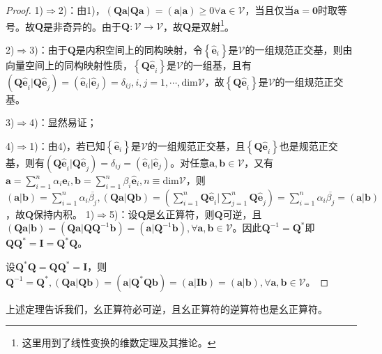 \documentclass[main.tex]{subfiles}
\begin{document}
\begin{proof}
    1)$\Rightarrow$2)：由1)，$\left(\mathbf{Qa}|\mathbf{Qa}\right)=\left(\mathbf{a}|\mathbf{a}\right)\geq0\forall\mathbf{a}\in\mathcal{V}$，当且仅当$\mathbf{a}=\mathbf{0}$时取等号。故$\mathbf{Q}$是非奇异的。由于$\mathbf{Q}:\mathcal{V}\rightarrow\mathcal{V}$，故$\mathbf{Q}$是双射\footnote{这里用到了线性变换的维数定理及其推论。}。

    2)$\Rightarrow$3)：由于$\mathbf{Q}$是内积空间上的同构映射，令$\left\{\mathbf{\hat{e}}_i\right\}$是$\mathcal{V}$的一组规范正交基，则由向量空间上的同构映射性质，$\left\{\mathbf{Q\hat{e}}_i\right\}$是$\mathcal{V}$的一组基，且有$\left(\mathbf{Q\hat{e}}_i|\mathbf{Q\hat{e}}_j\right)=\left(\mathbf{\hat{e}}_i|\mathbf{\hat{e}}_j\right)=\delta_{ij},i,j=1,\cdots,\mathrm{dim}\mathcal{V}$，故$\left\{\mathbf{Q\hat{e}}_i\right\}$是$\mathcal{V}$的一组规范正交基。

    3)$\Rightarrow$4)：显然易证；

    4)$\Rightarrow$1)：由4)，若已知$\left\{\mathbf{\hat{e}}_i\right\}$是$\mathcal{V}$的一组规范正交基，且$\left\{\mathbf{Q\hat{e}}_i\right\}$也是规范正交基，则有$\left(\mathbf{Q\hat{e}}_i|\mathbf{Q\hat{e}}_j\right)=\delta_{ij}=\left(\mathbf{\hat{e}}_i|\mathbf{\hat{e}}_j\right)$。对任意$\mathbf{a},\mathbf{b}\in\mathcal{V}$，又有$\mathbf{a}=\sum_{i=1}^{n}\alpha_i\mathbf{\hat{e}}_i,\mathbf{b}=\sum_{i=1}^{n}\beta_i\mathbf{\hat{e}}_i,n\equiv\mathrm{dim}\mathcal{V}$，则$\left(\mathbf{a}|\mathbf{b}\right)=\sum_{i=1}^n\alpha_i\overline{\beta_j},\left(\mathbf{Qa}|\mathbf{Qb}\right)=\left(\sum_{i=1}^n\mathbf{Q\hat{e}}_i|\sum_{j=1}^n\mathbf{Q\hat{e}}_j\right)=\sum_{i=1}^n\alpha_i\overline{\beta_j}=\left(\mathbf{a}|\mathbf{b}\right)$，故$\mathbf{Q}$保持内积。
    1)$\Rightarrow$5)：设$\mathbf{Q}$是幺正算符，则$\mathbf{Q}$可逆，且$\left(\mathbf{Qa}|\mathbf{b}\right)=\left(\mathbf{Qa}|\mathbf{QQ}^{-1}\mathbf{b}\right)=\left(\mathbf{a}|\mathbf{Q}^{-1}\mathbf{b}\right),\forall\mathbf{a},\mathbf{b}\in\mathcal{V}$。因此$\mathbf{Q}^{-1}=\mathbf{Q}^*$即$\mathbf{QQ}^*=\mathbf{I}=\mathbf{Q}^*\mathbf{Q}$。

    设$\mathbf{Q}^*\mathbf{Q}=\mathbf{QQ}^*=\mathbf{I}$，则$\mathbf{Q}^{-1}=\mathbf{Q}^*,\left(\mathbf{Qa}|\mathbf{Qb}\right)=\left(\mathbf{a}|\mathbf{Q}^*\mathbf{Qb}\right)=\left(\mathbf{a}|\mathbf{Ib}\right)=\left(\mathbf{a}|\mathbf{b}\right),\forall\mathbf{a},\mathbf{b}\in\mathcal{V}$。
\end{proof}

上述定理告诉我们，幺正算符必可逆，且幺正算符的逆算符也是幺正算符。
\end{document}
